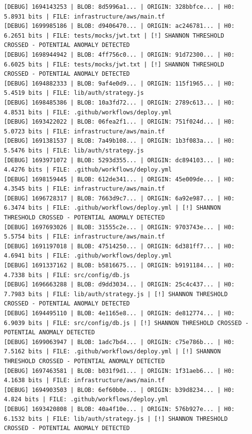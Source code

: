 \documentclass[12pt, a4paper, oneside]{report}
\begin{document}
\begin{lstlisting}[basicstyle=\tiny\ttfamily]
[DEBUG] 1694143253 | BLOB: 8d5996a1... | ORIGIN: 328bbfce... | H0: 5.8931 bits | FILE: infrastructure/aws/main.tf
[DEBUG] 1699985186 | BLOB: d9406470... | ORIGIN: ac246781... | H0: 6.2651 bits | FILE: tests/mocks/jwt.txt | [!] SHANNON THRESHOLD CROSSED - POTENTIAL ANOMALY DETECTED
[DEBUG] 1698944942 | BLOB: 4ff756c0... | ORIGIN: 91d72300... | H0: 6.6025 bits | FILE: tests/mocks/jwt.txt | [!] SHANNON THRESHOLD CROSSED - POTENTIAL ANOMALY DETECTED
[DEBUG] 1694882333 | BLOB: 9af4e0d9... | ORIGIN: 115f1965... | H0: 5.4519 bits | FILE: lib/auth/strategy.js
[DEBUG] 1698485386 | BLOB: 10a3fd72... | ORIGIN: 2789c613... | H0: 4.8531 bits | FILE: .github/workflows/deploy.yml
[DEBUG] 1693422022 | BLOB: 06fea2f1... | ORIGIN: 751f024d... | H0: 5.0723 bits | FILE: infrastructure/aws/main.tf
[DEBUG] 1691381537 | BLOB: 7a49b108... | ORIGIN: 1b3f083a... | H0: 5.5476 bits | FILE: lib/auth/strategy.js
[DEBUG] 1693971072 | BLOB: 5293d355... | ORIGIN: dc894103... | H0: 4.4276 bits | FILE: .github/workflows/deploy.yml
[DEBUG] 1698159445 | BLOB: 612de341... | ORIGIN: 45e009de... | H0: 4.3545 bits | FILE: infrastructure/aws/main.tf
[DEBUG] 1696728317 | BLOB: 7663d9c7... | ORIGIN: 6a92e987... | H0: 6.3474 bits | FILE: .github/workflows/deploy.yml | [!] SHANNON THRESHOLD CROSSED - POTENTIAL ANOMALY DETECTED
[DEBUG] 1697693026 | BLOB: 31555c2e... | ORIGIN: 9703743e... | H0: 5.5754 bits | FILE: infrastructure/aws/main.tf
[DEBUG] 1691197018 | BLOB: 47514250... | ORIGIN: 6d381ff7... | H0: 4.6941 bits | FILE: .github/workflows/deploy.yml
[DEBUG] 1691337162 | BLOB: b5816675... | ORIGIN: b9191184... | H0: 4.7338 bits | FILE: src/config/db.js
[DEBUG] 1696663288 | BLOB: d9dd3034... | ORIGIN: 25c4c437... | H0: 7.7983 bits | FILE: lib/auth/strategy.js | [!] SHANNON THRESHOLD CROSSED - POTENTIAL ANOMALY DETECTED
[DEBUG] 1694495110 | BLOB: 4e1165e8... | ORIGIN: de812774... | H0: 6.9039 bits | FILE: src/config/db.js | [!] SHANNON THRESHOLD CROSSED - POTENTIAL ANOMALY DETECTED
[DEBUG] 1699063947 | BLOB: 1adc7bd4... | ORIGIN: c75e786b... | H0: 7.5162 bits | FILE: .github/workflows/deploy.yml | [!] SHANNON THRESHOLD CROSSED - POTENTIAL ANOMALY DETECTED
[DEBUG] 1697463581 | BLOB: b031f9d1... | ORIGIN: 1f31aeb6... | H0: 4.1638 bits | FILE: infrastructure/aws/main.tf
[DEBUG] 1694903503 | BLOB: 6ef60b0e... | ORIGIN: b39d8234... | H0: 4.824 bits | FILE: .github/workflows/deploy.yml
[DEBUG] 1693420808 | BLOB: 40a4f10e... | ORIGIN: 576b927e... | H0: 6.1532 bits | FILE: lib/auth/strategy.js | [!] SHANNON THRESHOLD CROSSED - POTENTIAL ANOMALY DETECTED

\end{lstlisting}
\end{document}
